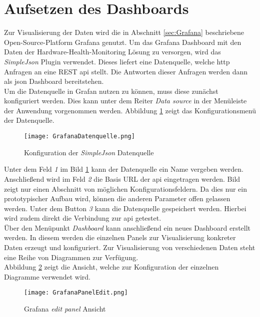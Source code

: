 \newpage
\section{Aufsetzen des Dashboards}\label{sec:AufsetzenDashboard}
Zur Visualisierung der Daten wird die in Abschnitt \ref{sec:Grafana} beschriebene Open-Source-Platform Grafana genutzt. Um das Grafana Dashboard mit den Daten der Hardware-Health-Monitoring Lösung zu versorgen, wird das \textit{SimpleJson} Plugin verwendet. Dieses liefert eine Datenquelle, welche \ac{http} Anfragen an eine REST \ac{api} stellt. Die Antworten dieser Anfragen werden dann als \ac{json} Dashboard bereitstehen.\\
Um die Datenquelle in Grafan nutzen zu können, muss diese zunächst konfiguriert werden. Dies kann unter dem Reiter \textit{Data source} in der Menüleiste der Anwendung vorgenommen werden. Abbildung \ref{fig:SimpleJSONKonfig} zeigt das Konfigurationsmenü der Datenquelle. 
\begin{center}
    \begin{figure}[h!]
        \centering
        \texttt{[image: GrafanaDatenquelle.png]}
        \caption{Konfiguration der \textit{SimpleJson} Datenquelle}
        \label{fig:SimpleJSONKonfig}
    \end{figure}
\end{center}
Unter dem Feld \textit{1} im Bild \ref{fig:SimpleJSONKonfig} kann der Datenquelle ein Name vergeben werden. Anschließend wird im Feld \textit{2} die Basis URL der \ac{api} eingetragen werden. Bild zeigt nur einen Abschnitt von möglichen Konfigurationsfeldern. Da dies nur ein prototypischer Aufbau wird, können die anderen Parameter offen gelassen werden. Unter dem Button \textit{3} kann die Datenquelle gespeichert werden. Hierbei wird zudem direkt die Verbindung zur \ac{api} getestet.\\
Über den Menüpunkt \textit{Dashboard} kann anschließend ein neues Dashboard erstellt werden. In diesem werden die einzelnen Panels zur Visualisierung konkreter Daten erzeugt und konfiguriert. Zur Visualisierung von verschiedenen Daten steht eine Reihe von Diagrammen zur Verfügung.\\
Abbildung \ref{fig:PanelBearbeitung} zeigt die Ansicht, welche zur Konfiguration der einzelnen Diagramme verwendet wird.
\begin{center}
    \begin{figure}[h!]
        \centering
        \texttt{[image: GrafanaPanelEdit.png]}
        \caption{Grafana \textit{edit panel} Ansicht}
        \label{fig:PanelBearbeitung}
    \end{figure}
\end{center}
